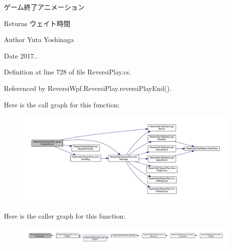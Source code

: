 ゲーム終了アニメーション 

\begin{DoxyReturn}{Returns}
ウェイト時間 
\end{DoxyReturn}
\begin{DoxyAuthor}{Author}
Yuta Yoshinaga 
\end{DoxyAuthor}
\begin{DoxyDate}{Date}
2017.. 
\end{DoxyDate}


Definition at line 728 of file Reversi\+Play.\+cs.



Referenced by Reversi\+Wpf.\+Reversi\+Play.\+reversi\+Play\+End().

Here is the call graph for this function\+:\nopagebreak
\begin{figure}[H]
\begin{center}
\leavevmode
\includegraphics[width=350pt]{class_reversi_wpf_1_1_reversi_play_a222edc5a1161d4859635ef87d46da59c_cgraph}
\end{center}
\end{figure}
Here is the caller graph for this function\+:\nopagebreak
\begin{figure}[H]
\begin{center}
\leavevmode
\includegraphics[width=350pt]{class_reversi_wpf_1_1_reversi_play_a222edc5a1161d4859635ef87d46da59c_icgraph}
\end{center}
\end{figure}
\mbox{\label{class_reversi_wpf_1_1_reversi_play_aee0447f5d955d0b2b66d14b491d90e81}} 
